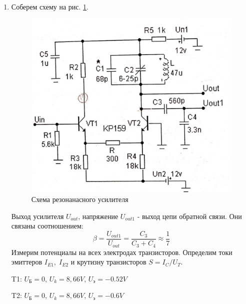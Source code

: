 \documentclass[a4paper]{article}
\begin{document}
\begin{enumerate}
    \item Соберем схему на рис. \ref{scheme_1}. \par

    \begin{figure}[H]
        \begin{center}
            \includegraphics[scale = 0.2]{scheme1.jpg}
            \caption{Схема резонанасного усилителя}
            \label{scheme_1}
        \end{center}
    \end{figure}

    Выход усилителя $U_{out}$, напряжение $U_{out1}$ - выход цепи обратной связи. Они связаны соотношением:
    $$\beta = \frac{U_{out1}}{U_{out}} = \frac{C_3}{C_3 + C_4} \approx \frac{1}{7}$$
    Измерим потенциалы на всех электродах транзисторов. Определим токи эмиттеров $I_{E1}, \; I_{E2}$ и крутизну транзисторов $S = I_C/U_T$.

    \begin{center}
        T1: $U_Б = 0$, $U_k = 8,66 V$, $U_э = -0.52 V$ \par 
        T2: $U_Б = 0$, $U_k = 8,66 V$, $U_э = -0.6 V$
    \end{center}

    \begin{center}
    \end{center}


\end{enumerate}
\end{document}
